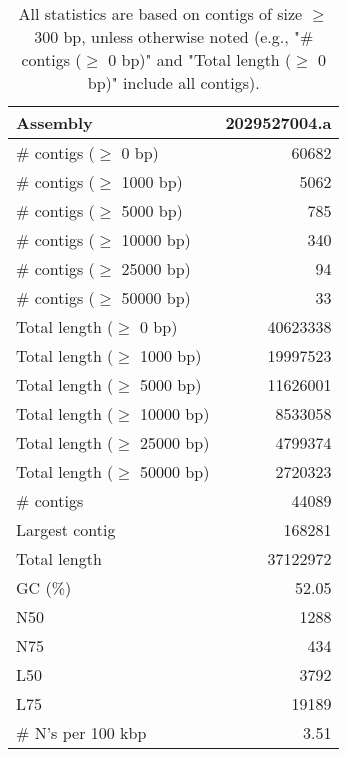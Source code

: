 \documentclass[12pt,a4paper]{article}
\begin{document}
\begin{table}[ht]
\begin{center}
\caption{All statistics are based on contigs of size $\geq$ 300 bp, unless otherwise noted (e.g., "\# contigs ($\geq$ 0 bp)" and "Total length ($\geq$ 0 bp)" include all contigs).}
\begin{tabular}{|l*{1}{|r}|}
\hline
Assembly & 2029527004.a \\ \hline
\# contigs ($\geq$ 0 bp) & 60682 \\ \hline
\# contigs ($\geq$ 1000 bp) & 5062 \\ \hline
\# contigs ($\geq$ 5000 bp) & 785 \\ \hline
\# contigs ($\geq$ 10000 bp) & 340 \\ \hline
\# contigs ($\geq$ 25000 bp) & 94 \\ \hline
\# contigs ($\geq$ 50000 bp) & 33 \\ \hline
Total length ($\geq$ 0 bp) & 40623338 \\ \hline
Total length ($\geq$ 1000 bp) & 19997523 \\ \hline
Total length ($\geq$ 5000 bp) & 11626001 \\ \hline
Total length ($\geq$ 10000 bp) & 8533058 \\ \hline
Total length ($\geq$ 25000 bp) & 4799374 \\ \hline
Total length ($\geq$ 50000 bp) & 2720323 \\ \hline
\# contigs & 44089 \\ \hline
Largest contig & 168281 \\ \hline
Total length & 37122972 \\ \hline
GC (\%) & 52.05 \\ \hline
N50 & 1288 \\ \hline
N75 & 434 \\ \hline
L50 & 3792 \\ \hline
L75 & 19189 \\ \hline
\# N's per 100 kbp & 3.51 \\ \hline
\end{tabular}
\end{center}
\end{table}
\end{document}
